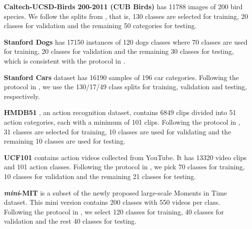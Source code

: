 \vspace{0.05cm}
{\hg
\vspace{0.05cm}
\noindent\textbf{Caltech-UCSD-Birds 200-2011 (CUB Birds)} \cite{WahCUB_200_2011} has 11788 images of 200 bird species. We follow the splits from  \cite{huang2020low}, that is, 130 classes are selected for training, 20 classes for validation and the remaining 50 categories for testing.

\vspace{0.05cm}
\noindent\textbf{Stanford Dogs} \cite{cars} has 17150 instances of 120 dogs classes where 70 classes are used for training, 20 classes for validation and the remaining 30 classes for testing, which is consistent with the protocol in \cite{huang2020low}.

\vspace{0.05cm}
\noindent\textbf{Stanford Cars} \cite{dogs} dataset has 16190 samples of 196 car categories. Following the protocol in \cite{huang2020low}, we use the 130/17/49 class splits for training, validation and testing, respectively.

\vspace{0.05cm}
\noindent\textbf{HMDB51} \cite{Kuehne11}, an action recognition dataset, contains 6849 clips divided into 51 action categories, each with a minimum of 101 clips. Following the protocol in \cite{arn}, 31  classes are selected for training, 10  classes are used for validating and the remaining 10  classes are used for testing. 

\vspace{0.05cm}
\noindent\textbf{UCF101} \cite{soomro2012ucf101} contains  action videos collected from YouTube. It has 13320 video clips and 101 action classes. Following the protocol in \cite{arn}, we pick 70 classes for training, 10 classes for validation and the remaining 21 classes for testing.

\vspace{0.05cm}
\noindent\textbf{\textit{mini}-MIT} \cite{monfortmoments} is a subset of the newly proposed large-scale Moments in Time dataset. This mini version contains 200 classes with 550 videos per class. Following the protocol in \cite{arn}, we select 120 classes for training, 40 classes for validation and the rest 40 classes for testing.
}

